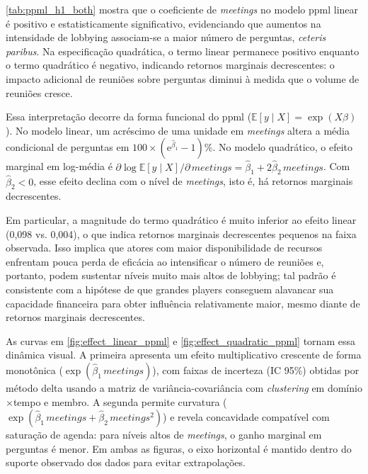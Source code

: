 \autoref{tab:ppml_h1_both} mostra que o coeficiente de \textit{meetings} no modelo \acrshort{ppml} linear é positivo e estatisticamente significativo, evidenciando que aumentos na intensidade de lobbying associam-se a maior número de perguntas, \textit{ceteris paribus}. Na especificação quadrática, o termo linear permanece positivo enquanto o termo quadrático é negativo, indicando retornos marginais decrescentes: o impacto adicional de reuniões sobre perguntas diminui à medida que o volume de reuniões cresce.

Essa interpretação decorre da forma funcional do \acrshort{ppml} (\(\mathbb{E}[y\mid X]=\exp(X\beta)\)). No modelo linear, um acréscimo de uma unidade em \textit{meetings} altera a média condicional de perguntas em \(100\times(\mathrm{e}^{\hat{\beta}_1}-1)\%\). No modelo quadrático, o efeito marginal em log-média é \(\partial\log\mathbb{E}[y\mid X]/\partial\,\textit{meetings}=\hat{\beta}_1+2\hat{\beta}_2\,\textit{meetings}\). Com \(\hat{\beta}_2<0\), esse efeito declina com o nível de \textit{meetings}, isto é, há retornos marginais decrescentes. 

Em particular, a magnitude do termo quadrático é muito inferior ao efeito linear (0,098 vs. 0,004), o que indica retornos marginais decrescentes pequenos na faixa observada. Isso implica que atores com maior disponibilidade de recursos enfrentam pouca perda de eficácia ao intensificar o número de reuniões e, portanto, podem sustentar níveis muito mais altos de lobbying; tal padrão é consistente com a hipótese de que grandes players conseguem alavancar sua capacidade financeira para obter influência relativamente maior, mesmo diante de retornos marginais decrescentes.


As curvas em \autoref{fig:effect_linear_ppml} e \autoref{fig:effect_quadratic_ppml} tornam essa dinâmica visual. A primeira apresenta um efeito multiplicativo crescente de forma monotônica (\(\exp(\hat{\beta}_1\,\allowbreak\textit{meetings})\)), com faixas de incerteza (IC 95\%) obtidas por método delta usando a matriz de variância-covariância com \textit{clustering} em domínio$\times$tempo e membro. A segunda permite curvatura (\(\exp(\hat{\beta}_1\,\allowbreak\textit{meetings}+\hat{\beta}_2\,\allowbreak\textit{meetings}^2)\)) e revela concavidade compatível com saturação de agenda: para níveis altos de \textit{meetings}, o ganho marginal em perguntas é menor. Em ambas as figuras, o eixo horizontal é mantido dentro do suporte observado dos dados para evitar extrapolações.

